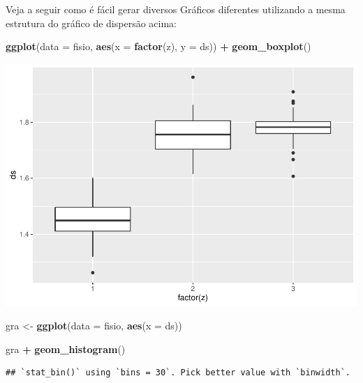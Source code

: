 \documentclass[
]{book}
\newenvironment{Shaded}{\begin{snugshade}}{\end{snugshade}}
\newcommand{\DataTypeTok}[1]{\textcolor[rgb]{0.13,0.29,0.53}{#1}}
\newcommand{\KeywordTok}[1]{\textcolor[rgb]{0.13,0.29,0.53}{\textbf{#1}}}
\newcommand{\NormalTok}[1]{#1}
\newcommand{\OperatorTok}[1]{\textcolor[rgb]{0.81,0.36,0.00}{\textbf{#1}}}
\newcommand{\StringTok}[1]{\textcolor[rgb]{0.31,0.60,0.02}{#1}}
\begin{document}
Veja a seguir como é fácil gerar diversos Gráficos diferentes utilizando a mesma estrutura do gráfico de dispersão acima:

\begin{Shaded}
\begin{Highlighting}[]
\KeywordTok{ggplot}\NormalTok{(}\DataTypeTok{data =}\NormalTok{ fisio, }\KeywordTok{aes}\NormalTok{(}\DataTypeTok{x =} \KeywordTok{factor}\NormalTok{(z), }\DataTypeTok{y =}\NormalTok{ ds)) }\OperatorTok{+}
\StringTok{  }\KeywordTok{geom_boxplot}\NormalTok{()}
\end{Highlighting}
\end{Shaded}

\includegraphics{TudodoR_files/figure-latex/unnamed-chunk-190-1.pdf}

\begin{Shaded}
\begin{Highlighting}[]
\NormalTok{gra <-}\StringTok{ }\KeywordTok{ggplot}\NormalTok{(}\DataTypeTok{data =}\NormalTok{ fisio, }\KeywordTok{aes}\NormalTok{(}\DataTypeTok{x =}\NormalTok{ ds)) }
\end{Highlighting}
\end{Shaded}

\begin{Shaded}
\begin{Highlighting}[]
\NormalTok{gra }\OperatorTok{+}\StringTok{  }\KeywordTok{geom_histogram}\NormalTok{()}
\end{Highlighting}
\end{Shaded}

\begin{verbatim}
## `stat_bin()` using `bins = 30`. Pick better value with `binwidth`.
\end{verbatim}
\end{document}

